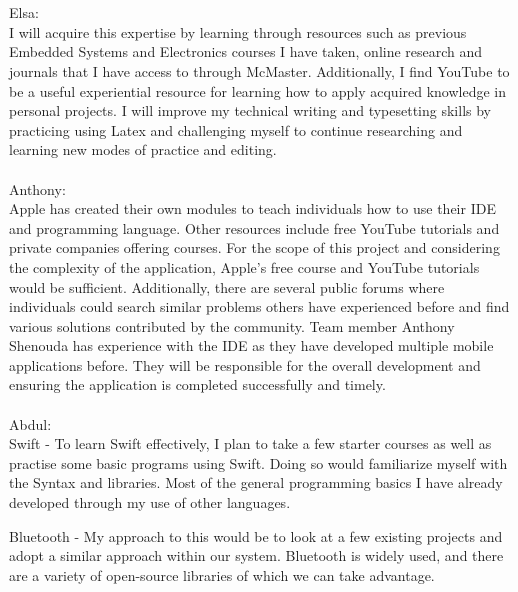 \documentclass[12pt]{article}
\begin{document}
\begin{enumerate}
\\
\\
Elsa:
\\ 
  I will acquire this expertise by learning through resources such as previous Embedded Systems and Electronics courses I have taken, online research and journals that I have access to through McMaster. Additionally, I find YouTube to be a useful experiential resource for learning how to apply acquired knowledge in personal projects. I will improve my technical writing and typesetting skills by practicing using Latex and challenging myself to continue researching and learning new modes of practice and editing.
\\
\\
Anthony:
\\
Apple has created their own modules to teach individuals how to use their IDE and programming language. Other resources include free YouTube tutorials and private companies offering courses. For the scope of this project and considering the complexity of the application, Apple’s free course and YouTube tutorials would be sufficient. Additionally, there are several public forums where individuals could search similar problems others have experienced before and find various solutions contributed by the community. Team member Anthony Shenouda has experience with the IDE as they have developed multiple mobile applications before. They will be responsible for the overall development and ensuring the application is completed successfully and timely. 
\\
\\
Abdul:
\\ 
 Swift -  To learn Swift effectively, I plan to take a few starter courses as well as practise some basic programs using Swift. Doing so would familiarize myself with the Syntax and libraries. Most of the general programming basics I have already developed through my use of other languages. 
  
 Bluetooth - My approach to this would be to look at a few existing projects and adopt a similar approach within our system. Bluetooth is widely used, and there are a variety of open-source libraries of which we can take advantage.
\end{enumerate}
\end{document}
